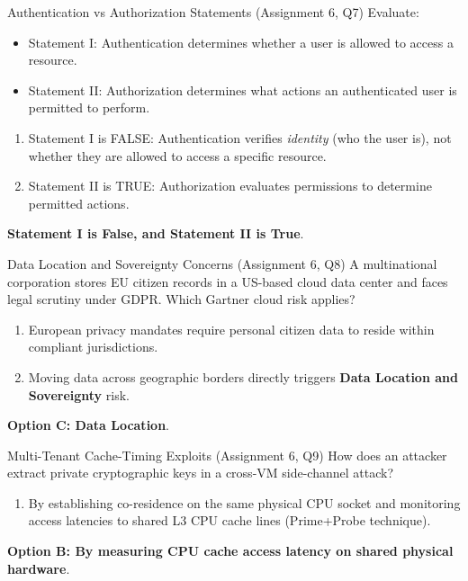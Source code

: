\begin{solved}{Authentication vs Authorization Statements (Assignment 6, Q7)}
\Given Evaluate:
\begin{itemize}
  \item Statement I: Authentication determines whether a user is allowed to access a resource.
  \item Statement II: Authorization determines what actions an authenticated user is permitted to perform.
\end{itemize}
\Steps
\begin{enumerate}[leftmargin=*]
  \item Statement I is FALSE: Authentication verifies \emph{identity} (who the user is), not whether they are allowed to access a specific resource.
  \item Statement II is TRUE: Authorization evaluates permissions to determine permitted actions.
\end{enumerate}
\Answer \textbf{Statement I is False, and Statement II is True}.
\end{solved}

\begin{solved}{Data Location and Sovereignty Concerns (Assignment 6, Q8)}
\Given A multinational corporation stores EU citizen records in a US-based cloud data center and faces legal scrutiny under GDPR. Which Gartner cloud risk applies?
\Steps
\begin{enumerate}[leftmargin=*]
  \item European privacy mandates require personal citizen data to reside within compliant jurisdictions.
  \item Moving data across geographic borders directly triggers \textbf{Data Location and Sovereignty} risk.
\end{enumerate}
\Answer \textbf{Option C: Data Location}.
\end{solved}

\begin{solved}{Multi-Tenant Cache-Timing Exploits (Assignment 6, Q9)}
\Given How does an attacker extract private cryptographic keys in a cross-VM side-channel attack?
\Steps
\begin{enumerate}[leftmargin=*]
  \item By establishing co-residence on the same physical CPU socket and monitoring access latencies to shared L3 CPU cache lines (Prime+Probe technique).
\end{enumerate}
\Answer \textbf{Option B: By measuring CPU cache access latency on shared physical hardware}.
\end{solved}

